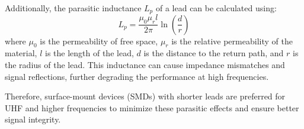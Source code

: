 Additionally, the parasitic inductance \( L_p \) of a lead can be calculated using:
\[ L_p = \frac{\mu_0 \mu_r l}{2\pi} \ln\left(\frac{d}{r}\right) \]
where \( \mu_0 \) is the permeability of free space, \( \mu_r \) is the relative permeability of the material, \( l \) is the length of the lead, \( d \) is the distance to the return path, and \( r \) is the radius of the lead. This inductance can cause impedance mismatches and signal reflections, further degrading the performance at high frequencies.

Therefore, surface-mount devices (SMDs) with shorter leads are preferred for UHF and higher frequencies to minimize these parasitic effects and ensure better signal integrity.

